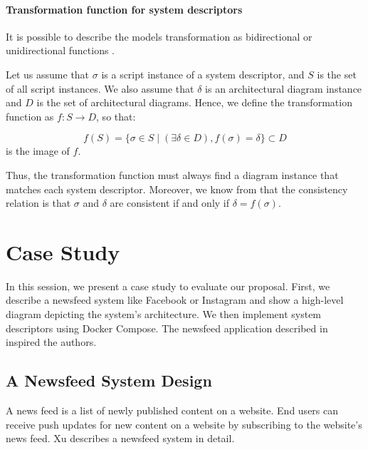 \documentclass[sigconf]{acmart}
\begin{document}
\paragraph{\textbf{Transformation function for system descriptors}}

It is possible to describe the models transformation as bidirectional or unidirectional functions \cite{stevens2008}. 

Let us assume that $\sigma$ is a script instance of a system descriptor, and $S$ is the set of all script instances. We also assume that $\delta$ is an architectural diagram instance and $D$ is the set of architectural diagrams. Hence, we define the transformation function as $f: S \rightarrow D$, so that:

\begin{equation}  
f(S) = \{\sigma \in S \mid (\exists \delta \in D), f(\sigma) = \delta\} \subset D
\end{equation}
is the image of $f$. 

Thus, the transformation function must always find a diagram instance that matches each system descriptor. Moreover, we know from \cite{stevens2008} that the consistency relation is that $\sigma$ and $\delta$ are consistent if and only if $ \delta = f(\sigma)$.

\section{Case Study}
\label{sec:case-study}

In this session, we present a case study to evaluate our proposal. First, we describe a newsfeed system like Facebook or Instagram and show a high-level diagram depicting the system's architecture. We then implement system descriptors using Docker Compose. The newsfeed application described in \cite{xu2020} inspired the authors.

\subsection{A Newsfeed System Design}

A news feed is a list of newly published content on a website. End users can receive push updates for new content on a website by subscribing to the website's news feed. Xu \cite{xu2020} describes a newsfeed system in detail. 
\end{document}
